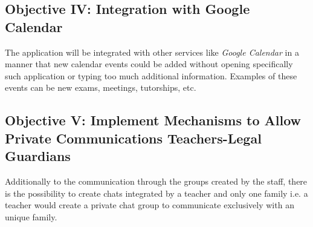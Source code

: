 \subsection{Objective IV: Integration with Google Calendar}
The application will be integrated with other services like \textit{Google Calendar} in a \mbox{manner} that new calendar events could be added without opening specifically such application or \mbox{typing} too much additional information. Examples of these events can be new exams, \linebreak meetings, tutorships, etc.

\clearpage

\subsection{Objective V: Implement Mechanisms to Allow Private Communications Teachers-Legal Guardians}
Additionally to the communication through the groups created by the staff, there is the \mbox{possibility} to create chats integrated by a teacher and only one family i.e. a teacher would create a private chat group to communicate exclusively with an unique family.

